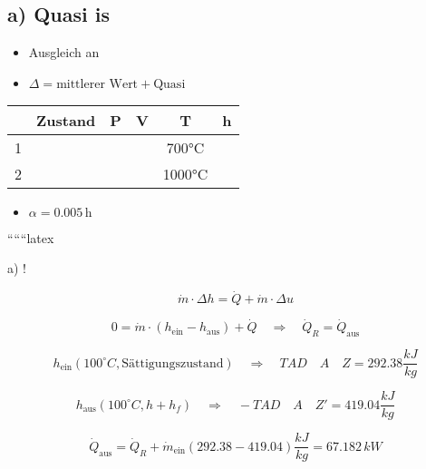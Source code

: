 \subsection*{a) Quasi is}
\begin{itemize}
    \item Ausgleich an 
    \item $\Delta = \text{mittlerer Wert} + \text{Quasi}$
\end{itemize}

\begin{tabular}{|c|c|c|c|c|c|}
    \hline
    & Zustand & P & V & T & h \\
    \hline
    1 & & & & 700°C & \\
    \hline
    2 & & & & 1000°C & \\
    \hline
\end{tabular}

\begin{itemize}
    \item $\alpha = 0.005 \, \text{h}$
\end{itemize}

``````latex

a) !

\[
\dot{m} \cdot \Delta h = \dot{Q} + \dot{m} \cdot \Delta u
\]

\[
0 = \dot{m} \cdot (h_{\text{ein}} - h_{\text{aus}}) + \dot{Q} \quad \Rightarrow \quad \dot{Q}_R = \dot{Q}_{\text{aus}}
\]

\[
h_{\text{ein}} (100^\circ C, \text{Sättigungszustand}) \quad \Rightarrow \quad TAD \quad A \quad Z = 292.38 \frac{kJ}{kg}
\]

\[
h_{\text{aus}} (100^\circ C, h + h_f) \quad \Rightarrow \quad -TAD \quad A \quad Z' = 419.04 \frac{kJ}{kg}
\]

\[
\dot{Q}_{\text{aus}} = \dot{Q}_R + \dot{m}_{\text{ein}} (292.38 - 419.04) \frac{kJ}{kg} = 67.182 \, kW
\]